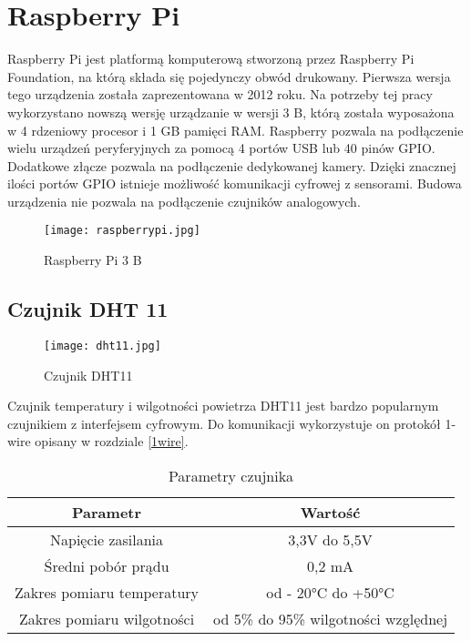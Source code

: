 \section{Raspberry Pi}
Raspberry Pi jest platformą komputerową stworzoną przez Raspberry Pi Foundation, na którą składa się pojedynczy obwód drukowany. Pierwsza wersja tego urządzenia została zaprezentowana w 2012 roku. Na potrzeby tej pracy wykorzystano nowszą wersję urządzanie w wersji 3 B, którą została wyposażona w 4 rdzeniowy procesor i 1 GB pamięci RAM. Raspberry pozwala na podłączenie wielu urządzeń peryferyjnych za pomocą 4 portów USB lub 40 pinów GPIO. Dodatkowe złącze pozwala na podłączenie dedykowanej kamery. Dzięki znacznej ilości portów GPIO istnieje możliwość komunikacji cyfrowej z sensorami. Budowa urządzenia nie pozwala na podłączenie czujników analogowych.
\begin{figure}[H]
	\centering
	\texttt{[image: raspberrypi.jpg]}
	\caption{Raspberry Pi 3 B}
	\label{fig:raspberrypi}
\end{figure}

\subsection{Czujnik DHT 11}
\begin{figure}[H]
	\centering
	\texttt{[image: dht11.jpg]}
	\caption{Czujnik DHT11}
	\label{fig:dht11}
\end{figure}
Czujnik temperatury i wilgotności powietrza DHT11 jest bardzo popularnym czujnikiem z interfejsem cyfrowym. Do komunikacji wykorzystuje on protokół 1-wire opisany w rozdziale \ref{1wire}.
\begin{table}[H]
	\centering
	\caption{Parametry czujnika}
	\begin{tabular}{|c|c|}
  		\hline 
  		\bfseries Parametr & \bfseries Wartość \\
  		\hline
  		Napięcie zasilania & 3,3V do 5,5V\\
  		\hline
  		Średni pobór prądu & 0,2 mA\\
  		\hline 
  		Zakres pomiaru temperatury & od - 20\si{\degree}C do +50\si{\degree}C\\
  		\hline 
  		Zakres pomiaru wilgotności & od 5\% do 95\% wilgotności względnej\\
  		\hline 
  	\end{tabular}
\end{table}

